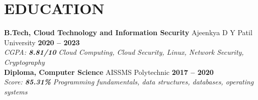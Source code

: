 \documentclass[10pt,a4paper]{article}
\begin{document}
\section{EDUCATION}
\textbf{B.Tech, Cloud Technology and Information Security} \textcolor{rulegray}{\textbar{}} Ajeenkya D Y Patil University \hfill \textbf{2020 -- 2023}\\[-1pt]
\textit{\small CGPA: \textbf{\color{brandblue}8.81/10}} \textcolor{rulegray}{\textbar{}} \textit{\small Cloud Computing, Cloud Security, Linux, Network Security, Cryptography}\\[2.5pt]
\textbf{Diploma, Computer Science} \textcolor{rulegray}{\textbar{}} AISSMS Polytechnic \hfill \textbf{2017 -- 2020}\\[-1pt]
\textit{\small Score: \textbf{\color{brandblue}85.31\%}} \textcolor{rulegray}{\textbar{}} \textit{\small Programming fundamentals, data structures, databases, operating systems}
\end{document}
